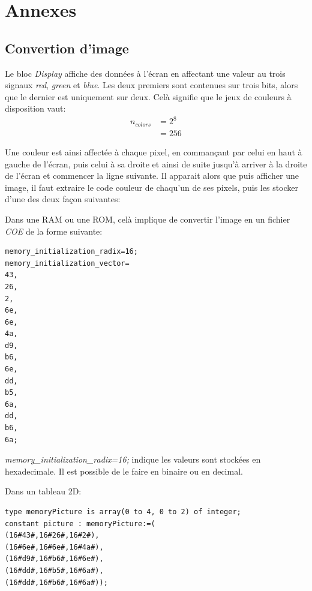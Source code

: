\documentclass[french]{nakrule}
\begin{document}
\asymmetricalPage
\chapter{Annexes}

\symmetricalPage

\section{Convertion d'image}
\label{sec:convertPicture}

Le bloc \emph{Display} affiche des données à l'écran en affectant une valeur au
trois signaux \emph{red}, \emph{green} et \emph{blue}. Les deux premiers sont
contenues sur trois bits, alors que le dernier est uniquement sur deux. Celà
signifie que le jeux de couleurs à disposition vaut:
\begin{align*}
  n_{colors} &= 2^{8}\\
             &= 256
\end{align*}

Une couleur est ainsi affectée à chaque pixel, en commançant par celui en haut à
gauche de l'écran, puis celui à sa droite et ainsi de suite jusqu'à arriver à la
droite de l'écran et commencer la ligne suivante. Il apparait alors que puis
afficher une image, il faut extraire le code couleur de chaqu'un de ses pixels,
puis les stocker d'une des deux façon suivantes:\vspace{.1in}
\begin{items}
\item Dans une RAM ou une ROM, celà implique de convertir l'image en un fichier
  \emph{COE} de la forme suivante:
  \begin{lstlisting}[frame=single, basicstyle=\scriptsize, backgroundcolor=\color{backcolor}]
memory_initialization_radix=16;
memory_initialization_vector=
43,
26,
2,
6e,
6e,
4a,
d9,
b6,
6e,
dd,
b5,
6a,
dd,
b6,
6a;
\end{lstlisting}
\emph{memory\_initialization\_radix=16;} indique les valeurs sont stockées en
hexadecimale. Il est possible de le faire en binaire ou en decimal.
\item Dans un tableau 2D:
  \begin{lstlisting}[style=vhdl]
type memoryPicture is array(0 to 4, 0 to 2) of integer;
constant picture : memoryPicture:=(
(16#43#,16#26#,16#2#),
(16#6e#,16#6e#,16#4a#),
(16#d9#,16#b6#,16#6e#),
(16#dd#,16#b5#,16#6a#),
(16#dd#,16#b6#,16#6a#));
  \end{lstlisting}
\end{items}
\end{document}
